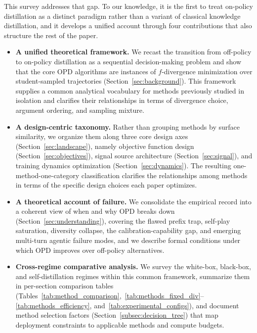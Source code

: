 \documentclass{article} %
\begin{document}
This survey addresses that gap. To our knowledge, it is the first to treat on-policy distillation as a distinct paradigm rather than a variant of classical knowledge distillation, and it develops a unified account through four contributions that also structure the rest of the paper.
\begin{itemize}[leftmargin=1.5em]
    \item \textbf{A unified theoretical framework.} We recast the transition from off-policy to on-policy distillation as a sequential decision-making problem and show that the core OPD algorithms are instances of $f$-divergence minimization over student-sampled trajectories (Section~\ref{sec:background}). This framework supplies a common analytical vocabulary for methods previously studied in isolation and clarifies their relationships in terms of divergence choice, argument ordering, and sampling mixture.
    \item \textbf{A design-centric taxonomy.} Rather than grouping methods by surface similarity, we organize them along three core design axes (Section~\ref{sec:landscape}), namely objective function design (Section~\ref{sec:objectives}), signal source architecture (Section~\ref{sec:signal}), and training dynamics optimization (Section~\ref{sec:dynamics}). The resulting one-method-one-category classification clarifies the relationships among methods in terms of the specific design choices each paper optimizes.
    \item \textbf{A theoretical account of failure.} We consolidate the empirical record into a coherent view of when and why OPD breaks down (Section~\ref{sec:understanding}), covering the flawed prefix trap, self-play saturation, diversity collapse, the calibration-capability gap, and emerging multi-turn agentic failure modes, and we describe formal conditions under which OPD improves over off-policy alternatives.
    \item \textbf{Cross-regime comparative analysis.} We survey the white-box, black-box, and self-distillation regimes within this common framework, summarize them in per-section comparison tables (Tables~\ref{tab:method_comparison},~\ref{tab:methods_fixed_div}--\ref{tab:methods_efficiency}, and~\ref{tab:experimental_configs}), and document method selection factors (Section~\ref{subsec:decision_tree}) that map deployment constraints to applicable methods and compute budgets.
\end{itemize}
\end{document}
